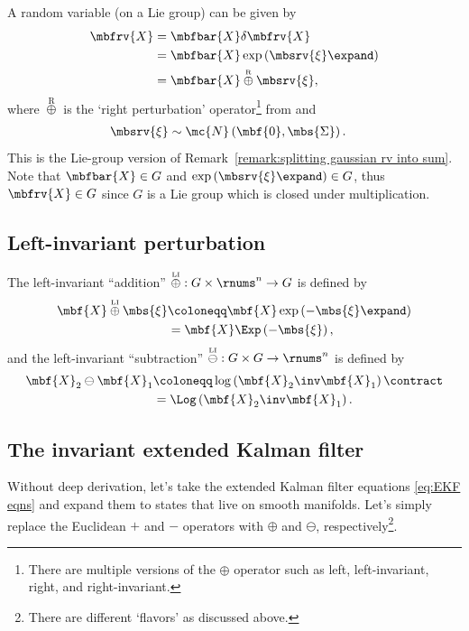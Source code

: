 \documentclass[nobib, nofonts, notoc]{tufte-handout}
\newcommand{\liplus}{\overset{{\scriptscriptstyle\mathrm{LI}}}{\oplus}}
\newcommand{\rplus}{\overset{{\scriptscriptstyle\mathrm{R}}}{\oplus}}
\newcommand{\liminus}{\overset{{\scriptscriptstyle\mathrm{LI}}}{\ominus}}
\begin{document}
    
    A random variable (on a Lie group) can be given by
    \begin{align}
        \mbfrv{X} &= \mbfbar{X}\delta\mbfrv{X}\\
        &= \mbfbar{X}\exp\left( \mbsrv{\xi}\expand \right)\\
        &= \mbfbar{X} \rplus \mbsrv{\xi},
    \end{align}
    where $\rplus$ is the `right perturbation' operator\footnote{There are multiple versions of the $\oplus$ operator such as left, left-invariant, right, and right-invariant.} from
     \cite{Sola_micro_2019} and
    \begin{align}
        \mbsrv{\xi} &\sim \mc{N}\left( \mbf{0}, \mbs{\Sigma} \right).
    \end{align}
    This is the Lie-group version of Remark~\ref{remark:splitting gaussian rv into sum}. Note that $\mbfbar{X}\in G$ and $\exp\left( \mbsrv{\xi}\expand \right)\in G$, thus $\mbfrv{X}\in G$ since $G$ is a Lie group which is closed under multiplication.

    \subsection{Left-invariant perturbation}
    The left-invariant ``addition'' $\liplus : G \times \rnums^{n} \to G$ is defined by
    \begin{align}
        \mbf{X}\liplus\mbs{\xi} 
        &\coloneqq \mbf{X}\exp\left( -\mbs{\xi}\expand \right)\\
        &= \mbf{X}\Exp\left( -\mbs{\xi} \right),
    \end{align}
    and the left-invariant ``subtraction'' $\liminus : G \times G \to \rnums^{n}$ is defined by
    \begin{align}
        \mbf{X}_{2}\ominus\mbf{X}_{1} 
        &\coloneqq \log\left(\mbf{X}_{2}\inv\mbf{X}_{1}\right)\contract\\
        &= \Log\left(\mbf{X}_{2}\inv\mbf{X}_{1}\right).
    \end{align}

    \subsection{The invariant extended Kalman filter}
    Without deep derivation, let's take the extended Kalman filter equations \eqref{eq:EKF eqns} and expand them to states that live on smooth manifolds. Let's simply replace the Euclidean $+$ and $-$ operators with $\oplus$ and $\ominus$, respectively\footnote{There are different `flavors' as discussed above.}. 
    
\end{document}
